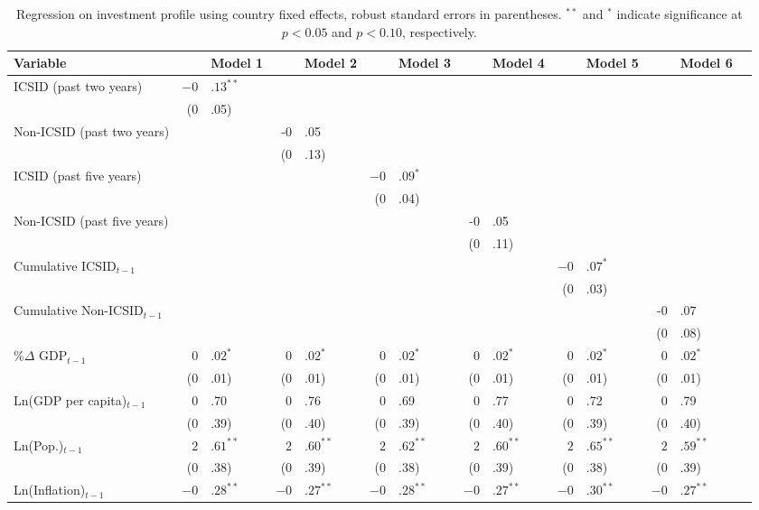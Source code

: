 \documentclass[12pt,onesided]{amsart}
\begin{document}
\begin{table}[ht]
\centering
\caption{Regression on investment profile using country fixed effects, robust standard errors in parentheses. $^{**}$ and $^{*}$ indicate significance at $p< 0.05 $ and $p< 0.10 $, respectively.} 
\label{tab:dispRepLevel}
{\footnotesize
\begin{tabular}{lr@{} lr@{}lr@{}lr@{} lr@{}lr@{}lr@{} }
 Variable && Model 1 && Model 2 && Model 3 && Model 4 && Model 5 && Model 6 \\ 
  \hline
\hline
ICSID (past two years) & $-0$&$.13^{\ast\ast}$ &&  &&  &&  &&  &&  \\ 
   & (0&.05) &&  &&  &&  &&  &&  \\ 
  Non-ICSID (past two years) &&  & -0&.05 &&  &&  &&  &&  \\ 
   &&  & (0&.13) &&  &&  &&  &&  \\ 
  ICSID (past five years) &&  &&  & $-0$&$.09^{\ast}$ &&  &&  &&  \\ 
   && &&  & (0&.04) &&  &&  &&  \\ 
  Non-ICSID (past five years) &&  &&  &&  & -0&.05 &&  &&  \\ 
   &&  &&  &&  & (0&.11) &&  &&  \\    
  Cumulative ICSID$_{t-1}$ &&  &&  &&  &&  & $-0$&$.07^{\ast}$ &&  \\ 
   &&  &&  &&  &&  & (0&.03) &&  \\ 
  Cumulative Non-ICSID$_{t-1}$ &&  &&  &&  &&  &&  & -0&.07 \\ 
   && &&  &&  &&  &&  & (0&.08) \\    
  \%$\Delta$ GDP$_{t-1}$ & $0$&$.02^{\ast}$ & $0$&$.02^{\ast}$ & $0$&$.02^{\ast}$ & $0$&$.02^{\ast}$ & $0$&$.02^{\ast}$ & $0$&$.02^{\ast}$ \\ 
   & (0&.01) & (0&.01) & (0&.01) & (0&.01) & (0&.01) & (0&.01) \\ 
  Ln(GDP per capita)$_{t-1}$ & 0&.70 & 0&.76 & 0&.69 & 0&.77 & 0&.72 & 0&.79 \\ 
   & (0&.39) & (0&.40) & (0&.39) & (0&.40) & (0&.39) & (0&.40) \\ 
  Ln(Pop.)$_{t-1}$ & $2$&$.61^{\ast\ast}$ & $2$&$.60^{\ast\ast}$ & $2$&$.62^{\ast\ast}$ & $2$&$.60^{\ast\ast}$ & $2$&$.65^{\ast\ast}$ & $2$&$.59^{\ast\ast}$ \\ 
   & (0&.38) & (0&.39) & (0&.38) & (0&.39) & (0&.38) & (0&.39) \\ 
  Ln(Inflation)$_{t-1}$ & $-0$&$.28^{\ast\ast}$ & $-0$&$.27^{\ast\ast}$ & $-0$&$.28^{\ast\ast}$ & $-0$&$.27^{\ast\ast}$ & $-0$&$.30^{\ast\ast}$ & $-0$&$.27^{\ast\ast}$ \\ 

\end{tabular}}
\end{table}
\end{document}
